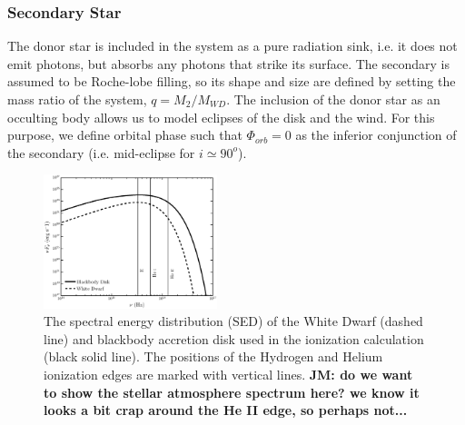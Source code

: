 \documentclass[preprint, a4paper, 11pt]{aastex}
\begin{document}
\subsubsection{Secondary Star}

The donor star is included in the system as a pure radiation sink, 
i.e. it does not emit photons, but absorbs any photons that strike its
surface. The secondary is assumed to be Roche-lobe filling, so its
shape and size are defined by setting the mass ratio of the system, $q
= M_2/M_{WD}$. The inclusion of the donor star as an occulting body
allows us to model eclipses of the disk and the wind. For this
purpose, we define orbital phase such that $\Phi_{orb} = 0$ as the
inferior conjunction of the secondary (i.e. mid-eclipse for $i \simeq
90^o$).

\begin{figure}
\centering
\includegraphics[width=0.45\textwidth]{figures/sed_figure.eps}
\caption{
The spectral energy distribution (SED) of the 
White Dwarf (dashed line) and blackbody accretion
disk used in the ionization calculation (black solid line).
The positions of the Hydrogen and Helium ionization edges 
are marked with vertical lines.
{\bf JM: do we want to show the stellar atmosphere spectrum here?
we know it looks a bit crap around the He II edge, so perhaps not...
 }
 }
\label{sed}
\end{figure}








%
%
\end{document}
